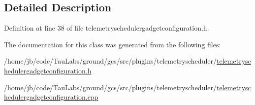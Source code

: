 \subsection{\-Detailed \-Description}


\-Definition at line 38 of file telemetryschedulergadgetconfiguration.\-h.



\-The documentation for this class was generated from the following files\-:\begin{DoxyCompactItemize}
\item 
/home/jb/code/\-Tau\-Labs/ground/gcs/src/plugins/telemetryscheduler/\hyperlink{telemetryschedulergadgetconfiguration_8h}{telemetryschedulergadgetconfiguration.\-h}\item 
/home/jb/code/\-Tau\-Labs/ground/gcs/src/plugins/telemetryscheduler/\hyperlink{telemetryschedulergadgetconfiguration_8cpp}{telemetryschedulergadgetconfiguration.\-cpp}\end{DoxyCompactItemize}
